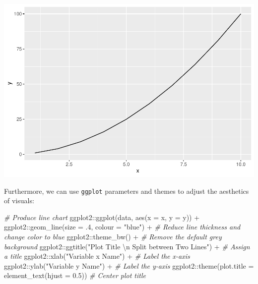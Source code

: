 \documentclass[
]{book}
\newenvironment{Shaded}{\begin{snugshade}}{\end{snugshade}}
\newcommand{\AttributeTok}[1]{\textcolor[rgb]{0.77,0.63,0.00}{#1}}
\newcommand{\CommentTok}[1]{\textcolor[rgb]{0.56,0.35,0.01}{\textit{#1}}}
\newcommand{\DecValTok}[1]{\textcolor[rgb]{0.00,0.00,0.81}{#1}}
\newcommand{\FloatTok}[1]{\textcolor[rgb]{0.00,0.00,0.81}{#1}}
\newcommand{\FunctionTok}[1]{\textcolor[rgb]{0.00,0.00,0.00}{#1}}
\newcommand{\NormalTok}[1]{#1}
\newcommand{\SpecialCharTok}[1]{\textcolor[rgb]{0.00,0.00,0.00}{#1}}
\newcommand{\StringTok}[1]{\textcolor[rgb]{0.31,0.60,0.02}{#1}}
\begin{document}
\includegraphics{People_Analytics_Lifecycle_files/figure-latex/unnamed-chunk-51-1.pdf}

Furthermore, we can use \texttt{ggplot} parameters and themes to adjust the aesthetics of visuals:

\begin{Shaded}
\begin{Highlighting}[]
\CommentTok{\# Produce line chart}
\NormalTok{ggplot2}\SpecialCharTok{::}\FunctionTok{ggplot}\NormalTok{(data, }\FunctionTok{aes}\NormalTok{(}\AttributeTok{x =}\NormalTok{ x, }\AttributeTok{y =}\NormalTok{ y)) }\SpecialCharTok{+}
\NormalTok{ggplot2}\SpecialCharTok{::}\FunctionTok{geom\_line}\NormalTok{(}\AttributeTok{size =}\NormalTok{ .}\DecValTok{4}\NormalTok{, }\AttributeTok{colour =} \StringTok{"blue"}\NormalTok{) }\SpecialCharTok{+} \CommentTok{\# Reduce line thickness and change color to blue}
\NormalTok{ggplot2}\SpecialCharTok{::}\FunctionTok{theme\_bw}\NormalTok{() }\SpecialCharTok{+} \CommentTok{\# Remove the default grey background}
\NormalTok{ggplot2}\SpecialCharTok{::}\FunctionTok{ggtitle}\NormalTok{(}\StringTok{"Plot Title }\SpecialCharTok{\textbackslash{}n}\StringTok{ Split between Two Lines"}\NormalTok{) }\SpecialCharTok{+} \CommentTok{\# Assign a title}
\NormalTok{ggplot2}\SpecialCharTok{::}\FunctionTok{xlab}\NormalTok{(}\StringTok{"Variable x Name"}\NormalTok{) }\SpecialCharTok{+} \CommentTok{\# Label the x{-}axis}
\NormalTok{ggplot2}\SpecialCharTok{::}\FunctionTok{ylab}\NormalTok{(}\StringTok{"Variable y Name"}\NormalTok{) }\SpecialCharTok{+} \CommentTok{\# Label the y{-}axis}
\NormalTok{ggplot2}\SpecialCharTok{::}\FunctionTok{theme}\NormalTok{(}\AttributeTok{plot.title =} \FunctionTok{element\_text}\NormalTok{(}\AttributeTok{hjust =} \FloatTok{0.5}\NormalTok{)) }\CommentTok{\# Center plot title}
\end{Highlighting}
\end{Shaded}
\end{document}
